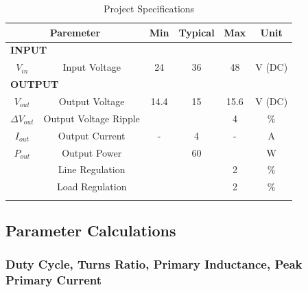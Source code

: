 \begin{table}[H]
\centering
\caption{Project Specifications}
\begin{tabular}{|c|c|c|c|c|c|}
\hline
\multicolumn{2}{|c|}{\textbf{Paremeter}}   & \textbf{Min}          & \textbf{Typical}      & \textbf{Max}          & \textbf{Unit}         \\ \hline
\multicolumn{2}{|l|}{\textbf{INPUT}}       & \multicolumn{1}{l|}{} & \multicolumn{1}{l|}{} & \multicolumn{1}{l|}{} & \multicolumn{1}{l|}{} \\ \hline
$V_{in}$  & Input Voltage                       & 24                    & 36                    & 48                    & V (DC)                   \\ \hline
\multicolumn{2}{|l|}{\textbf{OUTPUT}}      &                       &                       &                       &                       \\ \hline
$V_{out}$ & Output Voltage                      & 14.4                  & 15                    & 15.6                  & V (DC)                   \\ \hline
$\Delta V_{out}$ & Output Voltage Ripple & & & 4 & \%
\\ \hline
$I_{out}$ & Output Current                      & -                     & 4                  & -                     & A                     \\ \hline
$P_{out}$ & Output Power                        &                       & 60                    &                       & W                     \\ \hline
     & Line Regulation                     &                       &                       & 2                     & \%                    \\ \hline
     & Load Regulation                     &                       &                       & 2                     & \% 
     \\ \hline
\label{tab:specs}
\end{tabular}
\end{table}

\subsection{Parameter Calculations}

\subsubsection*{Duty Cycle, Turns Ratio, Primary Inductance, Peak Primary Current}

